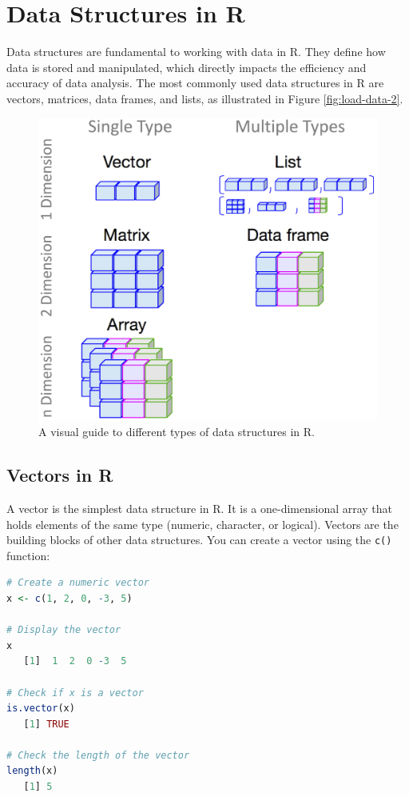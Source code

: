 \documentclass[
]{book}
\newcommand{\passthrough}[1]{#1}
\theoremstyle{definition}
\theoremstyle{definition}
\theoremstyle{definition}
\theoremstyle{definition}
\theoremstyle{remark}
\begin{document}
\section{Data Structures in R}\label{data-structures-in-r}

Data structures are fundamental to working with data in R. They define how data is stored and manipulated, which directly impacts the efficiency and accuracy of data analysis. The most commonly used data structures in R are vectors, matrices, data frames, and lists, as illustrated in Figure \ref{fig:load-data-2}.

\begin{figure}

{\centering \includegraphics[width=0.6\linewidth]{images/ch1_R-objects} 

}

\caption{A visual guide to different types of data structures in R.}\label{fig:R-objects}
\end{figure}

\subsection*{Vectors in R}\label{vectors-in-r}

A vector is the simplest data structure in R. It is a one-dimensional array that holds elements of the same type (numeric, character, or logical). Vectors are the building blocks of other data structures. You can create a vector using the \passthrough{\lstinline!c()!} function:

\begin{lstlisting}[language=R]
# Create a numeric vector
x <- c(1, 2, 0, -3, 5)

# Display the vector
x
   [1]  1  2  0 -3  5

# Check if x is a vector
is.vector(x)
   [1] TRUE

# Check the length of the vector
length(x)
   [1] 5
\end{lstlisting}
\end{document}
